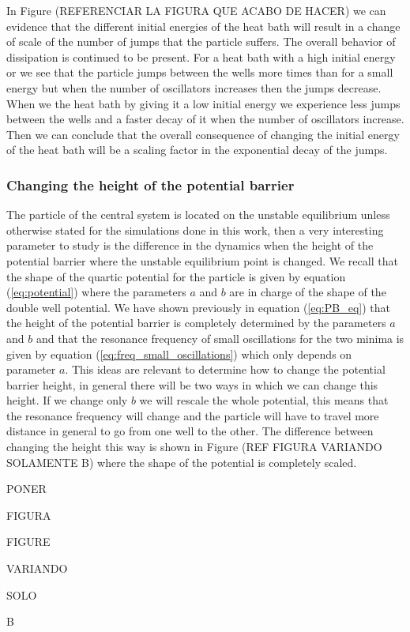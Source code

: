 In Figure (REFERENCIAR LA FIGURA QUE ACABO DE HACER) we can evidence that the different initial energies of the heat bath will result in a change of scale of the number of jumps that the particle suffers. The overall behavior of dissipation is continued to be present. For a heat bath with a high initial energy or  we see that the particle jumps between the wells more times than for a small energy but when the number of oscillators increases then the jumps decrease. When we  the heat bath by giving it a low initial energy we experience less jumps between the wells and a faster decay of it when the number of oscillators increase. Then we can conclude that the overall consequence of changing the initial energy of the heat bath will be a scaling factor in the exponential decay of the jumps.



\subsubsection{Changing the height of the potential barrier}
The particle of the central system is located on the unstable equilibrium unless otherwise stated for the simulations done in this work, then a very interesting parameter to study is the difference in the dynamics when the height of the potential barrier where the unstable equilibrium point is changed. We recall that the shape of the quartic potential for the particle is given by equation (\ref{eq:potential}) where the parameters $a$ and $b$ are in charge of the shape of the double well potential. We have shown previously in equation (\ref{eq:PB_eq}) that the height of the potential barrier is completely determined by the parameters $a$ and $b$ and that the resonance frequency of small oscillations for the two minima is given by equation (\ref{eq:freq_small_oscillations}) which only depends on parameter $a$. This ideas are relevant to determine how to change the potential barrier height, in general there will be two ways in which we can change this height. If we change only $b$ we will rescale the whole potential, this means that the resonance frequency will change and the particle will have to travel more distance in general to go from one well to the other. The difference between changing the height this way is shown in Figure (REF FIGURA VARIANDO SOLAMENTE B) where the shape of the potential is completely scaled.\par 
PONER\par 
FIGURA\par 
FIGURE\par 
VARIANDO\par 
SOLO\par 
B\par 

